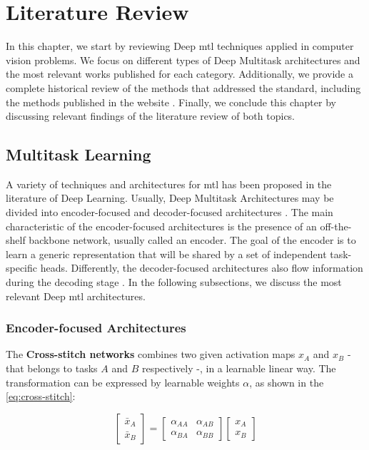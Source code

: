 \section{Literature Review} \label{sec:literature}

In this chapter, we start by reviewing Deep \acl{mtl} techniques applied in computer vision problems. We focus on different types of Deep Multitask architectures and the most relevant works published for each category. Additionally, we provide a complete historical review of the methods that addressed the \icao standard, including the methods published in the \fvcongoing website \citep{fvcongoing}. Finally, we conclude this chapter by discussing relevant findings of the literature review of both topics.

\subsection{Multitask Learning}

A variety of techniques and architectures for \acs{mtl} has been proposed in the literature of Deep Learning. Usually, Deep Multitask Architectures may be divided into encoder-focused and decoder-focused architectures \citep{vandenhende2021multi}. The main characteristic of the encoder-focused architectures \citep{kendall2018multi, chen2018gradnorm, sener2018multi} is the presence of an off-the-shelf backbone network, usually called an encoder. The goal of the encoder is to learn a generic representation that will be shared by a set of independent task-specific heads. Differently, the decoder-focused architectures also flow information during the decoding stage \citep{xu2018pad, zhang2018joint, vandenhende2020mti}. In the following subsections, we discuss the most relevant Deep \acl{mtl} architectures.

\subsubsection{Encoder-focused Architectures}

The \textbf{Cross-stitch networks} \citep{misra2016cross} combines two given activation maps $x_A$ and $x_B$ - that belongs to tasks $A$ and $B$ respectively -, in a learnable linear way. The transformation can be expressed by learnable weights $\alpha$, as shown in the \autoref{eq:cross-stitch}:

\begin{equation}
\label{eq:cross-stitch}
\begin{bmatrix}
\bar{x}_A\\ 
\bar{x}_B
\end{bmatrix} = 
\begin{bmatrix}
\alpha_{AA} & \alpha_{AB} \\ 
\alpha_{BA} & \alpha_{BB}
\end{bmatrix}
\begin{bmatrix}
x_A \\ 
x_B
\end{bmatrix}
\end{equation}

